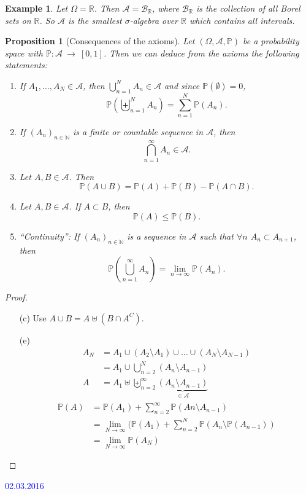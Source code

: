 \documentclass[a4paper]{article}
\newcommand{\lecture}{\vspace{5mm}\textcolor{blue}}
\newtheorem*{ex}{Example}
\newtheorem*{prop*}{Proposition}
\newcommand{\N}{\mathbb{N}}
\newcommand{\PP}{\mathbb{P}}
\newcommand{\R}{\mathbb{R}}
\begin{document}
\begin{ex}
  Let $\Omega = \R$. Then $\mathcal{A} = \mathcal{B}_{\R}$, where $\mathcal{B}_{\R}$ is the collection of all Borel sets on $\R$.
  So $\mathcal{A}$ is the smallest $\sigma$-algebra over $\R$ which contains all intervals.
\end{ex}

\begin{prop*}[Consequences of the axioms]
  Let $(\Omega,\mathcal{A},\PP)$ be a probability space with $\PP:\mathcal{A}~\to~[0,1]$.
  Then we can deduce from the axioms the following statements:
  \begin{enumerate}[label=(\alph*)]
    \item If $A_1,\dots,A_N \in \mathcal{A}$, then $\bigcup_{n=1}^N A_n \in \mathcal{A}$ and since $\PP(\emptyset) = 0$,
    \[ \PP(\biguplus_{n=1}^N A_n) = \sum_{n=1}^N \PP(A_n) \text{.} \]
    \item If $(A_n)_{n \in \N}$ is a finite or countable sequence in $\mathcal{A}$, then
    \[ \bigcap_{n=1}^\infty A_n \in \mathcal{A} \text{.} \]
    \item Let $A,B \in \mathcal{A}$. Then
    \[ \PP(A \cup B) = \PP(A) + \PP(B) - \PP(A \cap B) \text{.} \]
    \item Let $A,B \in \mathcal{A}$. If $A \subset B$, then 
    \[ \PP(A) \leq \PP(B) \text{.} \]
    \item \enquote{Continuity}: If $(A_n)_{n \in \N}$ is a sequence in $\mathcal{A}$ such that $\forall n$ $A_n \subset A_{n+1}$, then
    \[ \PP( \bigcup_{n=1}^\infty A_n ) = \lim_{n \to \infty} \PP(A_n) \text{.} \]
  \end{enumerate}
\end{prop*}

\begin{proof} 
  \begin{enumerate}
    \item[(c)] Use $A \cup B = A \uplus (B \cap A^C)$.
    \item[(e)] 
    \begin{align*}
      A_N &= A_1 \cup (A_2 \setminus A_1) \cup \dots \cup (A_N \setminus A_{N-1}) \\
      &= A_1 \cup \bigcup_{n=2}^N (A_n \setminus A_{n-1}) \\
      A &= A_1 \uplus \biguplus_{n=2}^\infty \underbrace{(A_n \setminus A_{n-1})}_{\in \mathcal{A}}
    \end{align*}
    \begin{align*}
      \PP(A) &= \PP(A_1) + \sum_{n=2}^\infty \PP (An \setminus A_{n-1}) \\
      &= \lim_{N \to \infty} (\PP(A_1) + \sum_{n=2}^N \PP(A_n \setminus \PP(A_{n-1})) \\
      &= \lim_{N \to \infty} \PP(A_N)
    \end{align*}
  \end{enumerate}
\end{proof}

\lecture{02.03.2016}
\end{document}

